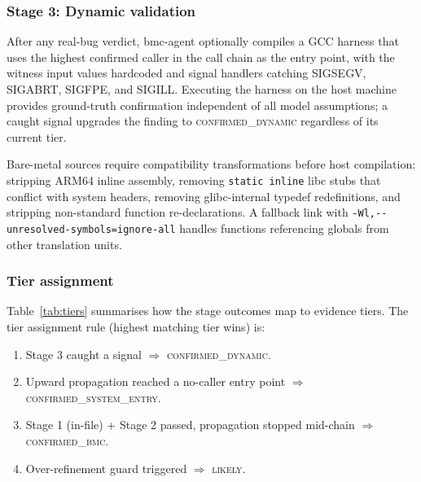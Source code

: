\documentclass[11pt,a4paper]{article}
\newcommand{\tool}{bmc-agent\xspace}
\newcommand{\dynconf}{\textsc{confirmed\_dynamic}\xspace}
\newcommand{\sysconf}{\textsc{confirmed\_system\_entry}\xspace}
\newcommand{\bmcconf}{\textsc{confirmed\_bmc}\xspace}
\newcommand{\likelyconf}{\textsc{likely}\xspace}
\begin{document}
\subsubsection{Stage 3: Dynamic validation}

After any real-bug verdict, \tool optionally compiles a GCC harness that
uses the highest confirmed caller in the call chain as the entry point, with
the witness input values hardcoded and signal handlers catching SIGSEGV,
SIGABRT, SIGFPE, and SIGILL. Executing the harness on the host machine
provides ground-truth confirmation independent of all model assumptions; a
caught signal upgrades the finding to \dynconf regardless of its current
tier.

Bare-metal sources require compatibility transformations before host
compilation: stripping ARM64 inline assembly, removing \texttt{static inline}
libc stubs that conflict with system headers, removing glibc-internal typedef
redefinitions, and stripping non-standard function re-declarations. A
fallback link with \verb|-Wl,--unresolved-symbols=ignore-all| handles
functions referencing globals from other translation units.

\subsubsection{Tier assignment}

Table~\ref{tab:tiers} summarises how the stage outcomes map to evidence
tiers. The tier assignment rule (highest matching tier wins) is:
\begin{enumerate}
  \item Stage 3 caught a signal $\Rightarrow$ \dynconf.
  \item Upward propagation reached a no-caller entry point
        $\Rightarrow$ \sysconf.
  \item Stage 1 (in-file) + Stage 2 passed, propagation stopped mid-chain
        $\Rightarrow$ \bmcconf.
  \item Over-refinement guard triggered $\Rightarrow$ \likelyconf.
\end{enumerate}
\end{document}
